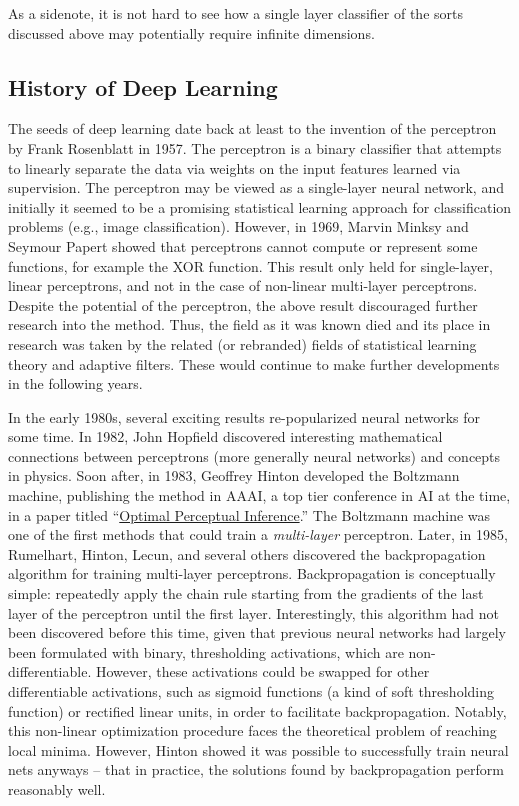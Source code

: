 As a sidenote, it is not hard to see how a single layer classifier of the sorts discussed above may potentially require infinite dimensions.

\subsection{History of Deep Learning}\label{ssec:history}

The seeds of deep learning date back at least to the invention of the perceptron by Frank Rosenblatt in 1957.
The perceptron is a binary classifier that attempts to linearly separate the data via weights on the input features learned via supervision.
The perceptron may be viewed as a single-layer neural network, and initially it seemed to be a promising statistical learning approach for classification problems (e.g., image classification).
However, in 1969, Marvin Minksy and Seymour Papert showed that perceptrons cannot compute or represent some functions, for example the XOR function.
This result only held for single-layer, linear perceptrons, and not in the case of non-linear multi-layer perceptrons.
Despite the potential of the perceptron, the above result discouraged further research into the method.
Thus, the field as it was known died and its place in research was taken by the related (or rebranded) fields of statistical learning theory and adaptive filters.
These would continue to make further developments in the following years.

In the early 1980s, several exciting results re-popularized neural networks for some time.
In 1982, John Hopfield discovered interesting mathematical connections between perceptrons (more generally neural networks) and concepts in physics.
Soon after, in 1983, Geoffrey Hinton developed the Boltzmann machine, publishing the method in AAAI, a top tier conference in AI at the time, in a paper titled ``\href{https://papers.cnl.salk.edu/PDFs/Optimal\%20Perceptual\%20Inference\%201983-646.pdf}{Optimal Perceptual Inference}.''
The Boltzmann machine was one of the first methods that could train a \textit{multi-layer} perceptron.
Later, in 1985, Rumelhart, Hinton, Lecun, and several others discovered the backpropagation algorithm for training multi-layer perceptrons.
Backpropagation is conceptually simple: repeatedly apply the chain rule starting from the gradients of the last layer of the perceptron until the first layer.
Interestingly, this algorithm had not been discovered before this time, given that previous neural networks had largely been formulated with binary, thresholding activations, which are non-differentiable.
However, these activations could be swapped for other differentiable activations, such as sigmoid functions (a kind of soft thresholding function) or rectified linear units, in order to facilitate backpropagation.
Notably, this non-linear optimization procedure faces the theoretical problem of reaching local minima.
However, Hinton showed it was possible to successfully train neural nets anyways -- that in practice, the solutions found by backpropagation perform reasonably well.

